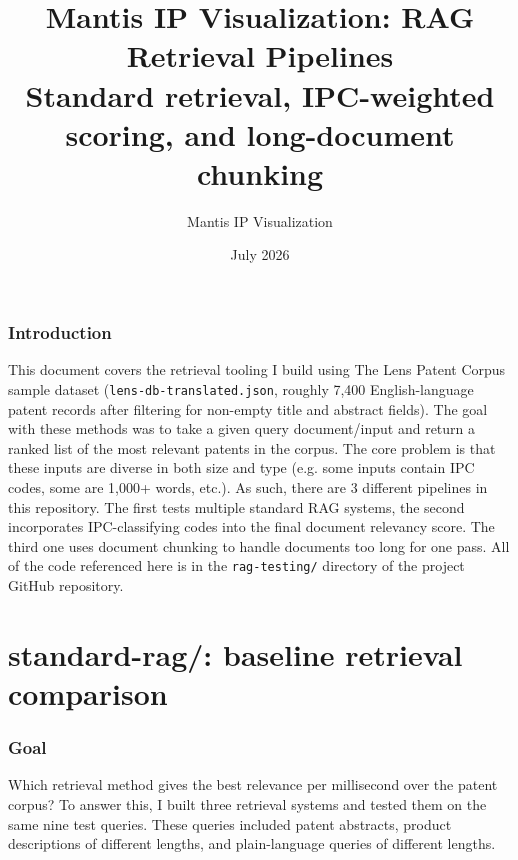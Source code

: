 \documentclass[11pt]{article}
\title{Mantis IP Visualization: RAG Retrieval Pipelines\\
\large Standard retrieval, IPC-weighted scoring, and long-document chunking}
\author{Mantis IP Visualization}
\date{July 2026}
\begin{document}
\maketitle
\tableofcontents
\newpage

\section{Introduction}

This document covers the retrieval tooling I build using The Lens Patent Corpus sample dataset (\texttt{lens-db-translated.json}, roughly 7,400 English-language patent records after
filtering for non-empty title and abstract fields). The goal with these methods was to take a given query document/input and return a ranked list of the most relevant patents in the corpus. The core problem is that these inputs are diverse in both size and type (e.g. some inputs contain IPC codes, some are 1,000+ words, etc.). As such, there are 3 different pipelines in this repository. The first tests multiple standard RAG systems, the second incorporates IPC-classifying codes into the final document relevancy score. The third one uses document chunking to handle documents too long for one pass. All of
the code referenced here is in the \texttt{rag-testing/} directory of the project
GitHub repository.

\part{standard-rag/: baseline retrieval comparison}

\section{Goal}

Which retrieval method gives the best relevance per millisecond over the patent
corpus? To answer this, I built three retrieval systems and tested them on the same
nine test queries. These queries included patent abstracts, product descriptions of
different lengths, and plain-language queries of different lengths.
\end{document}
